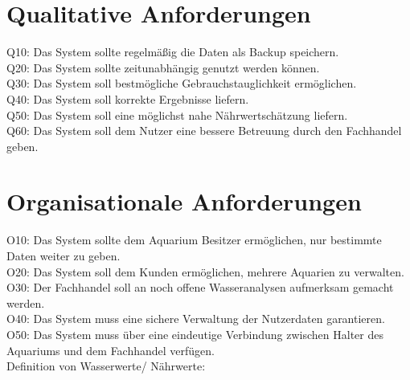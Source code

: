 \section{Qualitative Anforderungen}

	Q10: Das System sollte regelmäßig die Daten als Backup speichern.\\
	Q20: Das System sollte zeitunabhängig genutzt werden können.\\
	Q30: Das System soll bestmögliche Gebrauchstauglichkeit ermöglichen.\\
	Q40: Das System soll korrekte Ergebnisse liefern.\\
	Q50: Das System soll eine möglichst nahe Nährwertschätzung liefern.\\
	Q60: Das System soll dem Nutzer eine bessere Betreuung durch den Fachhandel geben.\\
	
	
\section{Organisationale Anforderungen}
	O10: Das System sollte dem Aquarium Besitzer ermöglichen, nur bestimmte Daten weiter zu geben.	\\
	O20: Das System soll dem Kunden ermöglichen, mehrere Aquarien zu verwalten.\\
	O30: Der Fachhandel soll an noch offene Wasseranalysen aufmerksam gemacht werden.\\
	O40: Das System muss eine sichere Verwaltung der Nutzerdaten garantieren.\\
	O50: Das System muss über eine eindeutige Verbindung zwischen Halter des Aquariums und dem Fachhandel verfügen.\\

Definition von Wasserwerte/ Nährwerte:
